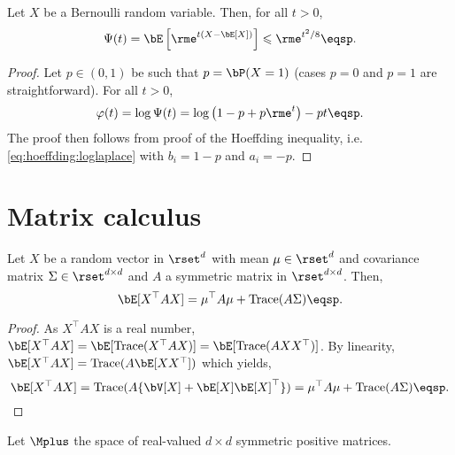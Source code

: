 \begin{shaded}
\begin{lemma}
\label{lem:bernoulli:bound}
Let $X$ be a Bernoulli random variable. Then, for all $t>0$,
\[
\Psi(t) = \bE\left[\rme^{t\left(X-\bE[X]\right)}\right] \leqslant \rme^{t^2/8}\eqsp.
\]
\end{lemma}
\end{shaded}

\begin{proof}
Let $p\in(0,1)$ be such that $p = \bP(X=1)$ (cases $p=0$ and $p=1$ are straightforward). For all $t>0$,
\[
\varphi(t) = \log \Psi(t) = \log\left(1-p+p\rme^t\right) - pt\eqsp.
\]
The proof then follows from proof of the Hoeffding inequality, i.e. \eqref{eq:hoeffding:loglaplace} with $b_i =1-p$ and $a_i = -p$.
\end{proof}



\section{Matrix calculus}

\begin{lemma}
\label{ref:expectation:quadratic:trasform}
Let $X$ be a random vector in $\rset^d$ with mean $\mu\in\rset^d$ and covariance matrix $\Sigma\in\rset^{d\times d}$ and $A$ a symmetric matrix in $\rset^{d\times d}$. Then,
$$
\bE[X^\top A X] = \mu^\top A \mu + \mathrm{Trace}(A\Sigma)\eqsp.
$$
\end{lemma}
\begin{proof}
As $X^\top A X$ is a real number, $\bE[X^\top A X] = \bE[\mathrm{Trace}(X^\top A X)] =  \bE[\mathrm{Trace}(AXX^\top )]$. By linearity, $\bE[X^\top A X] = \mathrm{Trace}(A\bE[XX^\top])$ which yields,
$$
\bE[X^\top A X] =   \mathrm{Trace}(A\{\bV[X] + \bE[X]\bE[X]^\top\}) =  \mu^\top A \mu + \mathrm{Trace}(A\Sigma)\eqsp.
$$
\end{proof}

Let $\Mplus$ the space of real-valued $d \times d$ symmetric positive matrices.

